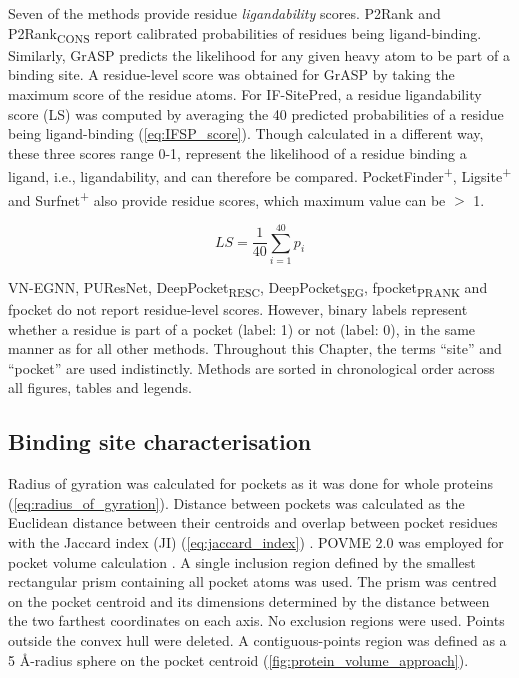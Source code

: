\newpage

Seven of the methods provide residue \textit{ligandability} scores. P2Rank and P2Rank\textsubscript{CONS} report calibrated probabilities of residues being ligand-binding. Similarly, GrASP predicts the likelihood for any given heavy atom to be part of a binding site. A residue-level score was obtained for GrASP by taking the maximum score of the residue atoms. For IF-SitePred, a residue ligandability score (LS) was computed by averaging the 40 predicted probabilities of a residue being ligand-binding (\autoref{eq:IFSP_score}). Though calculated in a different way, these three scores range 0-1, represent the likelihood of a residue binding a ligand, i.e., ligandability, and can therefore be compared. PocketFinder\textsuperscript{+}, Ligsite\textsuperscript{+} and Surfnet\textsuperscript{+} also provide residue scores, which maximum value can be $>$ 1.

\begin{equation}
LS = \frac{1}{40} \sum_{i=1}^{40} p_i
\label{eq:IFSP_score}
\end{equation}

VN-EGNN, PUResNet, DeepPocket\textsubscript{RESC}, DeepPocket\textsubscript{SEG}, fpocket\textsubscript{PRANK} and fpocket do not report residue-level scores. However, binary labels represent whether a residue is part of a pocket (label: 1) or not (label: 0), in the same manner as for all other methods. Throughout this Chapter, the terms ``site'' and ``pocket'' are used indistinctly. Methods are sorted in chronological order across all figures, tables and legends.

\subsection{Binding site characterisation}

Radius of gyration was calculated for pockets as it was done for whole proteins (\autoref{eq:radius_of_gyration}). Distance between pockets was calculated as the Euclidean distance \cite{300BC_EUCLID_ELEMENTS} between their centroids and overlap between pocket residues with the Jaccard index (JI) (\autoref{eq:jaccard_index}) \cite{JACCARD_1901_INDEX, JACCARD_1912_INDEX}. POVME 2.0 was employed for pocket volume calculation \cite{DURRANT_2011_POVME, DURRANT_2014_POVME2, WAGNER_2017_POVME3}. A single inclusion region defined by the smallest rectangular prism containing all pocket atoms was used. The prism was centred on the pocket centroid and its dimensions determined by the distance between the two farthest coordinates on each axis. No exclusion regions were used. Points outside the convex hull were deleted. A contiguous-points region was defined as a 5 \AA{}-radius sphere on the pocket centroid (\autoref{fig:protein_volume_approach}).

